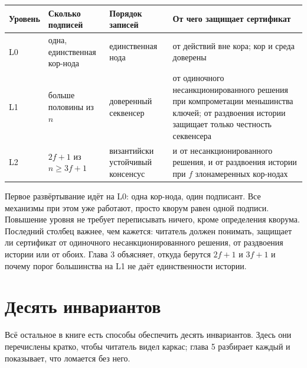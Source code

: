 \begin{center}
\small
\begin{tabular}{p{1.5cm} p{3.3cm} p{3.1cm} p{5.2cm}}
\toprule
Уровень & Сколько подписей & Порядок записей & От чего защищает сертификат \\
\midrule
L0 & одна, единственная кор-нода & единственная нода & от действий вне кора; кор и среда доверены \\
L1 & больше половины из $n$ & доверенный секвенсер & от одиночного несанкционированного решения при компрометации меньшинства ключей; от раздвоения истории защищает только честность секвенсера \\
L2 & $2f+1$ из $n \geq 3f+1$ & византийски устойчивый консенсус & и от несанкционированного решения, и от раздвоения истории при $f$ злонамеренных кор-нодах \\
\bottomrule
\end{tabular}
\end{center}

Первое развёртывание идёт на L0: одна кор-нода, один подписант. Все механизмы при этом уже работают, просто кворум равен одной подписи. Повышение уровня не требует переписывать ничего, кроме определения кворума. Последний столбец важнее, чем кажется: читатель должен понимать, защищает ли сертификат от одиночного несанкционированного решения, от раздвоения истории или от обоих. Глава 3 объясняет, откуда берутся $2f+1$ и $3f+1$ и почему порог большинства на L1 не даёт единственности истории.

\section{Десять инвариантов}

Всё остальное в книге есть способы обеспечить десять инвариантов. Здесь они перечислены кратко, чтобы читатель видел каркас; глава 5 разбирает каждый и показывает, что ломается без него.

